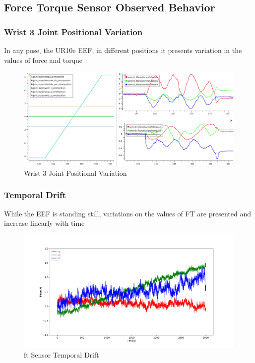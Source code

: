 \subsection{Force Torque Sensor Observed Behavior}

\subsubsection{Wrist 3 Joint Positional Variation}

\par In any pose, the UR10e EEF, in different positions it presents variation in the values of force and torque

\begin{figure}[h]
    \centering
    \includegraphics[width=0.9\linewidth]{figs/chp3/wrist_3_problem.png}
    \caption{Wrist 3 Joint Positional Variation}
    \label{fig:w3_problem}
\end{figure}


\subsubsection{Temporal Drift}

\par While the EEF is standing still, variations on the values of FT are presented and increase linearly with time

\begin{figure}[h]
    \centering
    \includegraphics[width=\linewidth]{figs/chp3/ft_sensor_drift.pdf}
    \caption{\ac{ft} Sensor Temporal Drift}
    \label{fig:ft_sensor_drift}
\end{figure}


